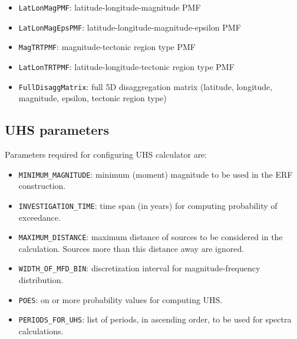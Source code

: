 \begin{itemize}
\begin{itemize}
\item \Verb+LatLonMagPMF+: latitude-longitude-magnitude PMF
\item \Verb+LatLonMagEpsPMF+: latitude-longitude-magnitude-epsilon PMF
\item \Verb+MagTRTPMF+: magnitude-tectonic region type PMF
\item \Verb+LatLonTRTPMF+: latitude-longitude-tectonic region type PMF
\item \Verb+FullDisaggMatrix+: full 5D disaggregation matrix (latitude, longitude, magnitude, epsilon, tectonic region type)
\end{itemize}
\end{itemize}

\subsection{UHS parameters}
Parameters required for configuring UHS calculator are:
\begin{itemize}
\item \Verb+MINIMUM_MAGNITUDE+: minimum (moment) magnitude to be used in the ERF construction.
\item \Verb+INVESTIGATION_TIME+: time span (in years) for computing probability of exceedance.
\item \Verb+MAXIMUM_DISTANCE+: maximum distance of sources to be considered in the calculation. Sources more than this distance away are ignored.
\item \Verb+WIDTH_OF_MFD_BIN+: discretization interval for  magnitude-frequency distribution.
\item \Verb+POES+: on or more probability values for computing UHS.
\item \Verb+PERIODS_FOR_UHS+:  list of periods, in ascending order, to be used for spectra calculations.
\end{itemize}